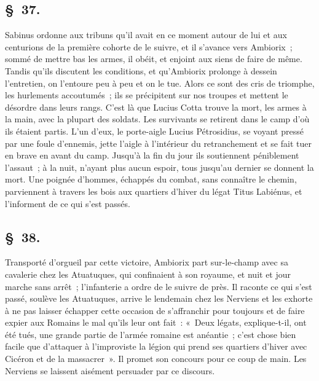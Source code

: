 \documentclass[french,twoside]{book} %
\begin{document}
\subsection[{§ 37.}]{ \textsc{§ 37.} }
\noindent Sabinus ordonne aux tribuns qu’il avait en ce moment autour de lui et aux centurions de la première cohorte de le suivre, et il s’avance vers Ambiorix ; sommé de mettre bas les armes, il obéit, et enjoint aux siens de faire de même. Tandis qu’ils discutent les conditions, et qu’Ambiorix prolonge à dessein l’entretien, on l’entoure peu à peu et on le tue. Alors ce sont des cris de triomphe, les hurlements accoutumés ; ils se précipitent sur nos troupes et mettent le désordre dans leurs rangs. C'est là que Lucius Cotta trouve la mort, les armes à la main, avec la plupart des soldats. Les survivants se retirent dans le camp d’où ils étaient partis. L'un d’eux, le porte-aigle Lucius Pétrosidius, se voyant pressé par une foule d’ennemis, jette l’aigle à l’intérieur du retranchement et se fait tuer en brave en avant du camp. Jusqu’à la fin du jour ils soutiennent péniblement l’assaut ; à la nuit, n’ayant plus aucun espoir, tous jusqu’au dernier se donnent la mort. Une poignée d’hommes, échappés du combat, sans connaître le chemin, parviennent à travers les bois aux quartiers d’hiver du légat Titus Labiénus, et l’informent de ce qui s’est passés.
\subsection[{§ 38.}]{ \textsc{§ 38.} }
\noindent Transporté d’orgueil par cette victoire, Ambiorix part sur-le-champ avec sa cavalerie chez les Atuatuques, qui confinaient à son royaume, et nuit et jour marche sans arrêt ; l’infanterie a ordre de le suivre de près. Il raconte ce qui s’est passé, soulève les Atuatuques, arrive le lendemain chez les Nerviens et les exhorte à ne pas laisser échapper cette occasion de s’affranchir pour toujours et de faire expier aux Romains le mal qu’ils leur ont fait : « Deux légats, explique-t-il, ont été tués, une grande partie de l’armée romaine est anéantie ; c’est chose bien facile que d’attaquer à l’improviste la légion qui prend ses quartiers d’hiver avec Cicéron et de la massacrer ». Il promet son concours pour ce coup de main. Les Nerviens se laissent aisément persuader par ce discours.
\end{document}
